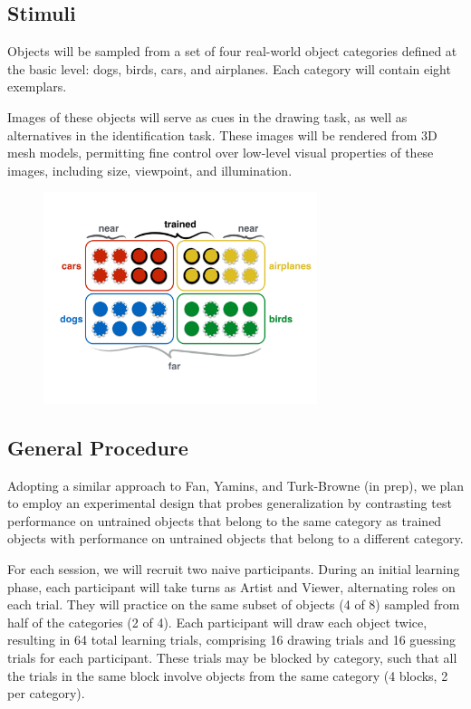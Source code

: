 \documentclass[12pt]{article}
\begin{document}
\subsection{Stimuli}

Objects will be sampled from a set of four real-world object categories defined at the basic level: dogs, birds, cars, and airplanes. Each category will contain eight exemplars. 

Images of these objects will serve as cues in the drawing task, as well as alternatives in the identification task. These images will be rendered from 3D mesh models, permitting fine control over low-level visual properties of these images, including size, viewpoint, and illumination. 

\begin{figure}[hbtp]
\begin{center}
\includegraphics[width=80mm]{figures/design.pdf}
\end{center}
\end{figure}
\vspace{-10mm}

\subsection{General Procedure}

Adopting a similar approach to Fan, Yamins, and Turk-Browne (in prep), we plan to employ an experimental design that probes generalization by contrasting test performance on untrained objects that belong to the same category as trained objects with performance on untrained objects that belong to a different category. 

For each session, we will recruit two naive participants. During an initial learning phase, each participant will take turns as Artist and Viewer, alternating roles on each trial. They will practice on the same subset of objects (4 of 8) sampled from half of the categories (2 of 4). Each participant will draw each object twice, resulting in 64 total learning trials, comprising 16 drawing trials and 16 guessing trials for each participant. These trials may be blocked by category, such that all the trials in the same block involve objects from the same category (4 blocks, 2 per category). 
\end{document}
